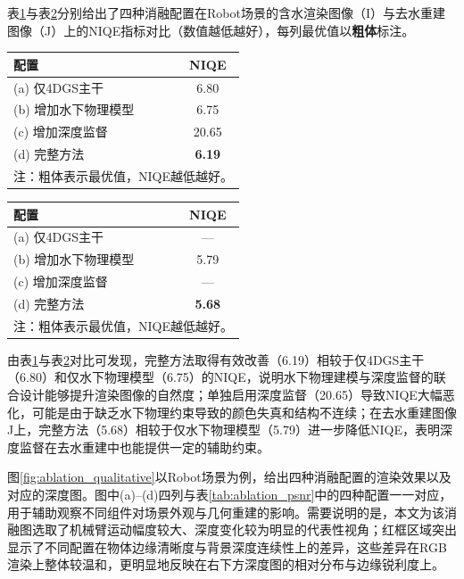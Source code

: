 表\ref{tab:ablation_nr_I}与表\ref{tab:ablation_nr_J}分别给出了四种消融配置在Robot场景的含水渲染图像（I）与去水重建图像（J）上的NIQE指标对比（数值越低越好），每列最优值以\textbf{粗体}标注。

\begin{table}[htbp]
  \centering
  \label{tab:ablation_nr_I}
  \begin{tabular}{lc}
    \hline
    \textbf{配置} & \textbf{NIQE} \\
    \hline
    (a) 仅4DGS主干       & 6.80 \\
    (b) 增加水下物理模型 & 6.75 \\
    (c) 增加深度监督     & 20.65 \\
    (d) 完整方法         & \textbf{6.19} \\
    \hline
    \multicolumn{2}{l}{\small 注：粗体表示最优值，NIQE越低越好。}
  \end{tabular}
\end{table}

\begin{table}[htbp]
  \centering
  \label{tab:ablation_nr_J}
  \begin{tabular}{lc}
    \hline
    \textbf{配置} & \textbf{NIQE} \\
    \hline
    (a) 仅4DGS主干       & —  \\
    (b) 增加水下物理模型 & 5.79 \\
    (c) 增加深度监督     & —  \\
    (d) 完整方法         & \textbf{5.68} \\
    \hline
    \multicolumn{2}{l}{\small 注：粗体表示最优值，NIQE越低越好。}
  \end{tabular}
\end{table}

由表\ref{tab:ablation_nr_I}与表\ref{tab:ablation_nr_J}对比可发现，完整方法取得有效改善（6.19）相较于仅4DGS主干（6.80）和仅水下物理模型（6.75）的NIQE，说明水下物理建模与深度监督的联合设计能够提升渲染图像的自然度；单独启用深度监督（20.65）导致NIQE大幅恶化，可能是由于缺乏水下物理约束导致的颜色失真和结构不连续；在去水重建图像J上，完整方法（5.68）相较于仅水下物理模型（5.79）进一步降低NIQE，表明深度监督在去水重建中也能提供一定的辅助约束。

图\ref{fig:ablation_qualitative}以Robot场景为例，给出四种消融配置的渲染效果以及对应的深度图。图中(a)--(d)四列与表\ref{tab:ablation_psnr}中的四种配置一一对应，用于辅助观察不同组件对场景外观与几何重建的影响。需要说明的是，本文为该消融图选取了机械臂运动幅度较大、深度变化较为明显的代表性视角；红框区域突出显示了不同配置在物体边缘清晰度与背景深度连续性上的差异，这些差异在RGB渲染上整体较温和，更明显地反映在右下方深度图的相对分布与边缘锐利度上。



